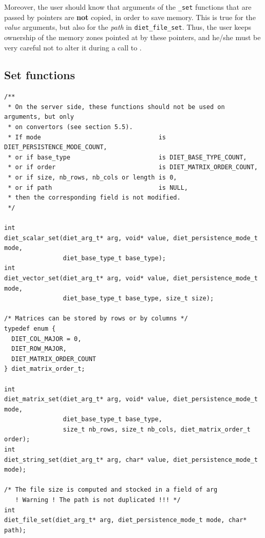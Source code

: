 Moreover, the user should know that arguments of the \texttt{\_set} functions
that are passed by pointers are \textbf{not} copied, in order to save memory.
This is true for the \emph{value} arguments, but also for the \emph{path} in
\texttt{diet\_file\_set}. Thus, the user keeps ownership of the memory zones
pointed at by these pointers, and he/she must be very careful not to alter it
during a call to \diet.

\subsection{Set functions}


\label{sec:setfun}
{\footnotesize
\begin{verbatim}
/**
 * On the server side, these functions should not be used on arguments, but only
 * on convertors (see section 5.5).
 * If mode                                is DIET_PERSISTENCE_MODE_COUNT, 
 * or if base_type                        is DIET_BASE_TYPE_COUNT,
 * or if order                            is DIET_MATRIX_ORDER_COUNT,
 * or if size, nb_rows, nb_cols or length is 0,
 * or if path                             is NULL,
 * then the corresponding field is not modified.
 */

int
diet_scalar_set(diet_arg_t* arg, void* value, diet_persistence_mode_t mode,
                diet_base_type_t base_type);
int
diet_vector_set(diet_arg_t* arg, void* value, diet_persistence_mode_t mode,
                diet_base_type_t base_type, size_t size);

/* Matrices can be stored by rows or by columns */
typedef enum {
  DIET_COL_MAJOR = 0,
  DIET_ROW_MAJOR,
  DIET_MATRIX_ORDER_COUNT
} diet_matrix_order_t;

int
diet_matrix_set(diet_arg_t* arg, void* value, diet_persistence_mode_t mode,
                diet_base_type_t base_type,
                size_t nb_rows, size_t nb_cols, diet_matrix_order_t order);
int
diet_string_set(diet_arg_t* arg, char* value, diet_persistence_mode_t mode);

/* The file size is computed and stocked in a field of arg
   ! Warning ! The path is not duplicated !!! */
int
diet_file_set(diet_arg_t* arg, diet_persistence_mode_t mode, char* path);
\end{verbatim}
}


